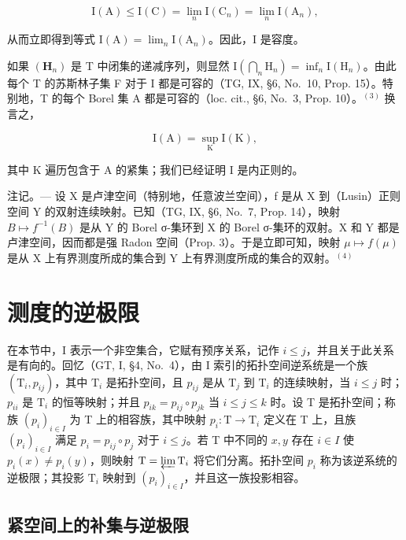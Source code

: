 \[
\mathrm{I} (\mathrm{A}) \leqslant \mathrm{I} (\mathrm{C}) = \lim _ {n} \mathrm{I} (\mathrm{C} _ {n}) = \lim _ {n} \mathrm{I} (\mathrm{A} _ {n}),
\]

从而立即得到等式 \(\mathrm{I}(\mathrm{A})=\lim_{n}\mathrm{I}(\mathrm{A}_{n})\)。因此，I 是容度。

如果 \((\mathbf{H}_{n})\) 是 T 中闭集的递减序列，则显然 \(\mathrm{I}\left(\bigcap_{n}\mathrm{H}_{n}\right)=\inf_{n}\mathrm{I}(\mathrm{H}_{n})\)。由此每个 T 的苏斯林子集 F 对于 I 都是可容的（TG, IX, §6, No.~10, Prop. 15）。特别地，T 的每个 Borel 集 A 都是可容的（loc. cit., §6, No.~3, Prop. 10）。\(^{(3)}\) 换言之，

\[
\mathrm{I} (\mathrm{A}) = \sup _ {\mathrm{K}} \mathrm{I} (\mathrm{K}),
\]

其中 K 遍历包含于 A 的紧集；我们已经证明 I 是内正则的。

注记。--- 设 X 是卢津空间（特别地，任意波兰空间），f 是从 X 到（Lusin）正则空间 Y 的双射连续映射。已知（TG, IX, §6, No.~7, Prop. 14），映射 \(B \mapsto f^{-1}(B)\) 是从 Y 的 Borel σ-集环到 X 的 Borel σ-集环的双射。X 和 Y 都是卢津空间，因而都是强 Radon 空间（Prop. 3）。于是立即可知，映射 \(\mu \mapsto f(\mu)\) 是从 X 上有界测度所成的集合到 Y 上有界测度所成的集合的双射。\(^{(4)}\)

\section{测度的逆极限}

在本节中，I 表示一个非空集合，它赋有预序关系，记作 \(i \leqslant j\)，并且关于此关系是有向的。回忆（GT, I, §4, No.~4），由 I 索引的拓扑空间逆系统是一个族 \((\mathrm{T}_i, p_{ij})\)，其中 \(\mathrm{T}_i\) 是拓扑空间，且 \(p_{ij}\) 是从 \(\mathrm{T}_j\) 到 \(\mathrm{T}_i\) 的连续映射，当 \(i \leqslant j\) 时；\(p_{ii}\) 是 \(\mathrm{T}_i\) 的恒等映射；并且 \(p_{ik} = p_{ij} \circ p_{jk}\) 当 \(i \leqslant j \leqslant k\) 时。设 T 是拓扑空间；称族 \((p_i)_{i \in I}\) 为 T 上的相容族，其中映射 \(p_i: \mathrm{T} \to \mathrm{T}_i\) 定义在 T 上，且族 \((p_i)_{i \in I}\) 满足 \(p_i = p_{ij} \circ p_j\) 对于 \(i \leqslant j\)。若 T 中不同的 \(x, y\) 存在 \(i \in I\) 使 \(p_i(x) \neq p_i(y)\)，则映射 \(\mathrm{T} = \varprojlim \mathrm{T}_i\) 将它们分离。拓扑空间 \(p_i\) 称为该逆系统的逆极限；其投影 \(\mathrm{T}_i\) 映射到 \((p_i)_{i \in I}\)，并且这一族投影相容。

\subsection{紧空间上的补集与逆极限}

